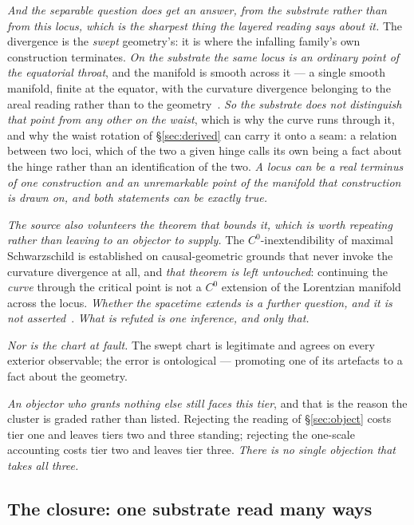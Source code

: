 \documentclass[11pt,a4paper]{article}
\theoremstyle{plain}
\theoremstyle{definition}
\begin{document}
\emph{And the separable question does get an answer, from the substrate rather than from this locus, which is
the sharpest thing the layered reading says about it.} The divergence is the \emph{swept} geometry's: it is
where the infalling family's own construction terminates. \emph{On the substrate the same locus is an
ordinary point of the equatorial throat}, and the manifold is smooth across it --- a single smooth manifold,
finite at the equator, with the curvature divergence belonging to the areal reading rather than to the
geometry~\cite{JanzenSlicing}. \emph{So the substrate does not distinguish that point from any other on the
waist}, which is why the curve runs through it, and why the waist rotation of
\S\ref{sec:derived} can carry it onto a seam: a relation between two loci, which of the two a given hinge calls its own
being a fact about the hinge rather than an identification of the two. \emph{A locus can be a real terminus of one construction
and an unremarkable point of the manifold that construction is drawn on, and both statements can be
exactly true.}

\emph{The source also volunteers the theorem that bounds it, which is worth repeating rather than leaving to
an objector to supply.} The $C^{0}$-inextendibility of maximal Schwarzschild is established on
causal-geometric grounds that never invoke the curvature divergence at all, and \emph{that theorem is left
untouched}: continuing the \emph{curve} through the critical point is not a $C^{0}$ extension of the
Lorentzian manifold across the locus. \emph{Whether the spacetime extends is a further question, and it is
not asserted}~\cite{JanzenCircle}. \emph{What is refuted is one inference, and only that.}

\emph{Nor is the chart at fault.} The swept chart is legitimate and agrees on every exterior observable; the
error is ontological --- promoting one of its artefacts to a fact about the geometry.

\emph{An objector who grants nothing else still faces this tier}, and that is the reason the cluster is
graded rather than listed. Rejecting the reading of \S\ref{sec:object} costs tier one and leaves tiers two
and three standing; rejecting the one-scale accounting costs tier two and leaves tier three. \emph{There is
no single objection that takes all three.}




\subsection{The closure: one substrate read many ways}
\end{document}
